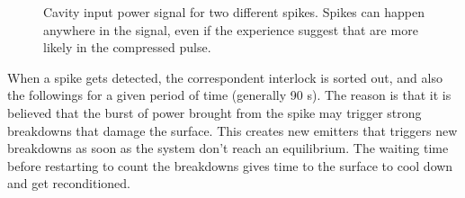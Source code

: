  \begin{figure}[h]
 \centering
 \hspace{2mm}
 \caption{Cavity input power signal for two different spikes. Spikes can happen anywhere in the signal, even if the experience suggest that are more likely in the compressed pulse.}
 \label{spikesAndDetuning}
 \end{figure}


When a spike gets detected, the correspondent interlock is sorted out, and also the followings for a given period of time (generally 90 s). The reason is that it is believed that the burst of power brought from the spike may trigger strong breakdowns that damage the surface. This creates new emitters that triggers new breakdowns as soon as the system don't reach an equilibrium. The waiting time before restarting to count the breakdowns gives time to the surface to cool down and get reconditioned.


